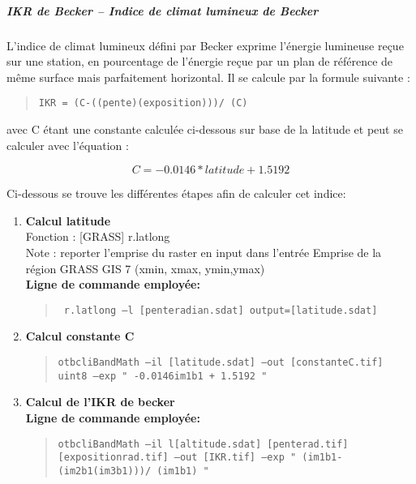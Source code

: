 \subparagraph{IKR de Becker – Indice de climat lumineux de Becker }


L’indice de climat lumineux défini par Becker exprime l’énergie lumineuse reçue sur une station, en pourcentage de l’énergie reçue par un plan de référence de même surface mais parfaitement horizontal. Il se calcule par la formule suivante : 
\begin{quote}
    
\texttt{IKR = \sin(C-\atan((pente)\times \cos(exposition)))/ \sin(C) }

\end{quote}

avec C étant une constante calculée ci-dessous sur base de la latitude et peut se calculer avec l'équation :

\begin{equation}
C= -0.0146* latitude + 1.5192 
\end{equation}

Ci-dessous se trouve les différentes étapes afin de calculer cet indice:
\begin{enumerate}
   

        \item  \textbf{Calcul latitude}\\
Fonction : [GRASS] r.latlong \\
Note : reporter l’emprise du raster en input  dans l’entrée Emprise de la région GRASS GIS 7 (xmin, xmax, ymin,ymax)\\
\textbf{Ligne de commande employée:} 
\begin{quote}
\texttt{ r.latlong --l [pente\textunderscore radian.sdat] output=[latitude.sdat]}
\end{quote}
 
 

        \item \textbf {Calcul constante C}
\begin{quote}
 \texttt{otbcli\textunderscore BandMath --il [latitude.sdat] --out [constante\textunderscore C.tif] \; uint8 \; --exp " -0.0146\times im1b1 + 1.5192 "} 
   \end{quote}
  
        \item \textbf {Calcul de l’IKR de becker} \\


\textbf{Ligne de commande employée:}
\begin{quote}
 \texttt{otbcli\textunderscore BandMath --il l[altitude.sdat] [pente\textunderscore rad.tif]
 [exposition\textunderscore rad.tif] --out [IKR.tif] --exp  " \sin(im1b1-\atan(im2b1\times \cos(im3b1)))/ \sin(im1b1) " } \\
   
   \end{quote}

\end{enumerate}


